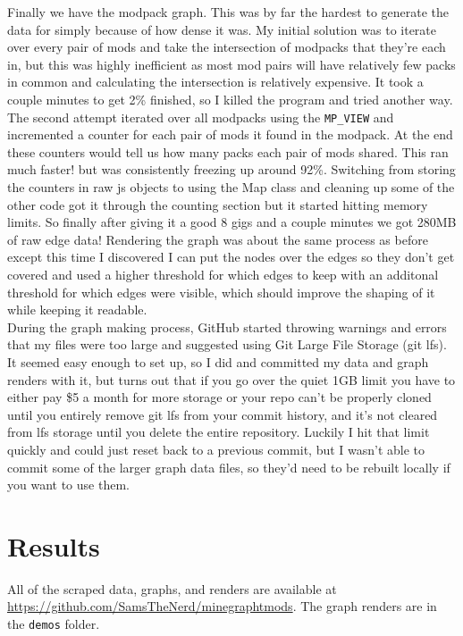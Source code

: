 \documentclass[a4paper,11pt, twocolumn]{article}
\begin{document}
Finally we have the modpack graph. This was by far the hardest to generate the data for simply because of how dense it was. My initial solution was to iterate over every pair of mods and take the intersection of modpacks that they're each in, but this was highly inefficient as most mod pairs will have relatively few packs in common and calculating the intersection is relatively expensive. It took a couple minutes to get 2\% finished, so I killed the program and tried another way. The second attempt iterated over all modpacks using the \verb|MP_VIEW| and incremented a counter for each pair of mods it found in the modpack. At the end these counters would tell us how many packs each pair of mods shared. This ran much faster! but was consistently freezing up around 92\%. Switching from storing the counters in raw js objects to using the Map class and cleaning up some of the other code got it through the counting section but it started hitting memory limits. So finally after giving it a good 8 gigs and a couple minutes we got 280MB of raw edge data! Rendering the graph was about the same process as before except this time I discovered I can put the nodes over the edges so they don't get covered and used a higher threshold for which edges to keep with an additonal threshold for which edges were visible, which should improve the shaping of it while keeping it readable.\\

During the graph making process, GitHub started throwing warnings and errors that my files were too large and suggested using Git Large File Storage (git lfs). It seemed easy enough to set up, so I did and committed my data and graph renders with it, but turns out that if you go over the quiet 1GB limit you have to either pay \$5 a month for more storage or your repo can't be properly cloned until you entirely remove git lfs from your commit history, and it's not cleared from lfs storage until you delete the entire repository. Luckily I hit that limit quickly and could just reset back to a previous commit, but I wasn't able to commit some of the larger graph data files, so they'd need to be rebuilt locally if you want to use them.

\section{Results}

All of the scraped data, graphs, and renders are available at \url{https://github.com/SamsTheNerd/minegraphtmods}. The graph renders are in the \verb|demos| folder.
\end{document}
